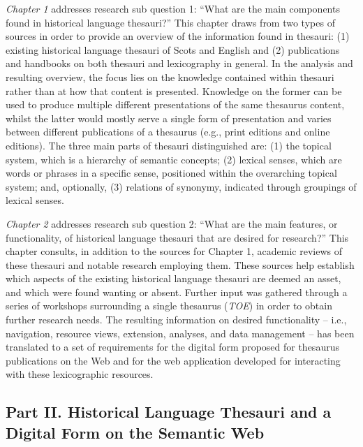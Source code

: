 \textit{Chapter 1} addresses research sub question 1: ``What are the main components found in historical language thesauri?'' This chapter draws from two types of sources in order to provide an overview of the information found in thesauri: (1) existing historical language thesauri of Scots and English and (2) publications and handbooks on both thesauri and lexicography in general. In the analysis and resulting overview, the focus lies on the knowledge contained within thesauri rather than at how that content is presented. Knowledge on the former can be used to produce multiple different presentations of the same thesaurus content, whilst the latter would mostly serve a single form of presentation and varies between different publications of a thesaurus (e.g., print editions and online editions). The three main parts of thesauri distinguished are: (1) the topical system, which is a hierarchy of semantic concepts; (2) lexical senses, which are words or phrases in a specific sense, positioned within the overarching topical system; and, optionally, (3) relations of synonymy, indicated through groupings of lexical senses.

\textit{Chapter 2} addresses research sub question 2: ``What are the main features, or functionality, of historical language thesauri that are desired for research?'' This chapter consults, in addition to the sources for Chapter 1, academic reviews of these thesauri and notable research employing them. These sources help establish which aspects of the existing historical language thesauri are deemed an asset, and which were found wanting or absent. Further input was gathered through a series of workshops surrounding a single thesaurus (\textit{TOE}) in order to obtain further research needs. The resulting information on desired functionality -- i.e., navigation, resource views, extension, analyses, and data management -- has been translated to a set of requirements for the digital form proposed for thesaurus publications on the Web and for the web application developed for interacting with these lexicographic resources.

%
%



\subsection*{Part II. Historical Language Thesauri and a Digital Form on the Semantic Web}

